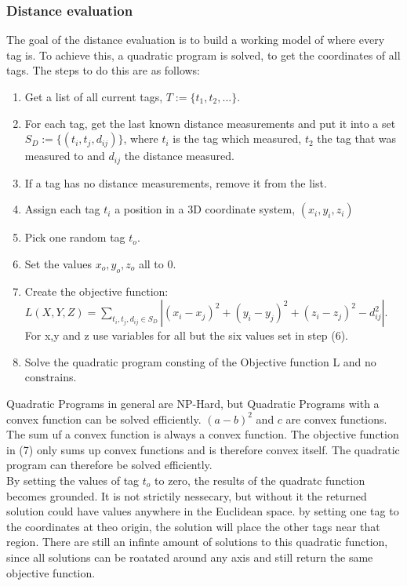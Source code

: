 \subsubsection{Distance evaluation}
\label{ss:distance_eval}
The goal of the distance evaluation is to build a working model of where every tag is.
To achieve this, a quadratic program is solved, to get the coordinates of all tags.
The steps to do this are as follows:
\begin{enumerate}
	\item Get a list of all current tags, $T:=\{ t_1, t_2, ... \}$.
	\item For each tag, get the last known distance measurements and put it into a set $S_D:=\{ (t_i, t_j, d_{ij}) \} $, where $t_i$ is the tag which measured, $t_2$ the tag that was measured to and $d_{ij}$ the distance measured.
	\item If a tag has no distance measurements, remove it from the list.
	\item Assign each tag $t_i$ a position in a 3D coordinate system, $(x_i,y_i,z_i)$
	\item Pick one random tag $t_{o}$.
	\item Set the values $x_{o},y_{o},z_{o}$ all to 0.
	\item Create the objective function: $L(X,Y,Z) = \sum\limits_{t_i, t_j, d_{ij} \in S_D}|(x_i-x_j)^2+(y_i-y_j)^2+(z_i-z_j)^2-d_{ij}^2|$. For x,y and z use variables for all but the six values set in step (6).
	\item Solve the quadratic program consting of the Objective function L and no constrains.
\end{enumerate}
Quadratic Programs in general are NP-Hard, but Quadratic Programs with a convex function can be solved efficiently.
$(a-b)^2$ and $c$ are convex functions.
The sum uf a convex function is always a convex function.
The objective function in (7) only sums up convex functions and is therefore convex itself.
The quadratic program can therefore be solved efficiently.\\
By setting the values of tag $t_{o}$ to zero, the results of the quadratc function becomes grounded.
It is not strictily nessecary, but without it the returned solution could have values anywhere in the Euclidean space.
by setting one tag to the coordinates at theo origin, the solution will place the other tags near that region.
There are still an infinte amount of solutions to this quadratic function, since all solutions can be roatated around any axis and still return the same objective function.


